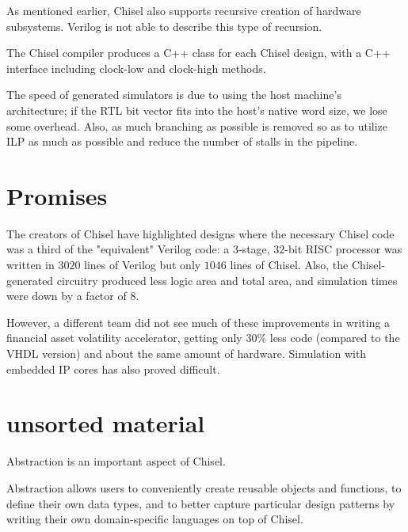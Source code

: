 \documentclass[a4paper,11pt]{article}
\begin{document}
As mentioned earlier, Chisel also supports recursive creation of hardware subsystems. Verilog is not able to describe this type of recursion.

The Chisel compiler produces a C++ class for each Chisel design, with a C++ interface including clock-low and clock-high methods.

The speed of generated simulators is due to using the host machine's architecture; if the RTL bit vector fits into the host's native word size, we lose some overhead. Also, as much branching as possible is removed so as to utilize ILP as much as possible and reduce the number of stalls in the pipeline.

\section{Promises}

The creators of Chisel have highlighted designs where the necessary Chisel code was a third of the "equivalent" Verilog code: a $3$-stage, $32$-bit RISC processor was written in $3020$ lines of Verilog but only $1046$ lines of Chisel. Also, the Chisel-generated circuitry produced less logic area and total area, and simulation times were down by a factor of $8$.

However, a different team did not see much of these improvements in writing a financial asset volatility accelerator, getting only $30\%$ less code (compared to the VHDL version) and about the same amount of hardware. Simulation with embedded IP cores has also proved difficult.

\section{unsorted material}

Abstraction is an important aspect of Chisel.

Abstraction allows users to conveniently create reusable objects and functions, to define their own data types, and to better capture particular design patterns by writing their own domain-specific languages on top of Chisel.

\end{document}
